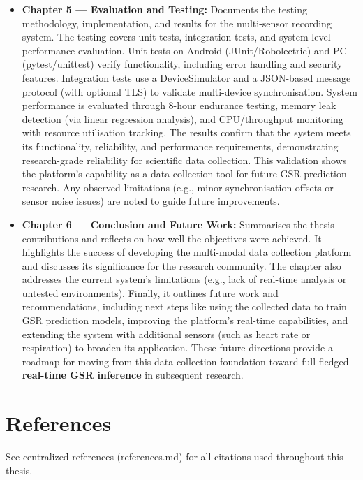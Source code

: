 \begin{itemize}
  \item \textbf{Chapter 5 --- Evaluation and Testing:} Documents the testing methodology, implementation, and results for the multi-sensor recording system. The testing covers unit tests, integration tests, and system-level performance evaluation. Unit tests on Android (JUnit/Robolectric) and PC (pytest/unittest) verify functionality, including error handling and security features. Integration tests use a DeviceSimulator and a JSON-based message protocol (with optional TLS) to validate multi-device synchronisation. System performance is evaluated through 8-hour endurance testing, memory leak detection (via linear regression analysis), and CPU/throughput monitoring with resource utilisation tracking. The results confirm that the system meets its functionality, reliability, and performance requirements, demonstrating research-grade reliability for scientific data collection. This validation shows the platform's capability as a data collection tool for future GSR prediction research. Any observed limitations (e.g., minor synchronisation offsets or sensor noise issues) are noted to guide future improvements.
  \item \textbf{Chapter 6 --- Conclusion and Future Work:} Summarises the thesis contributions and reflects on how well the objectives were achieved. It highlights the success of developing the multi-modal data collection platform and discusses its significance for the research community. The chapter also addresses the current system's limitations (e.g., lack of real-time analysis or untested environments). Finally, it outlines future work and recommendations, including next steps like using the collected data to train GSR prediction models, improving the platform's real-time capabilities, and extending the system with additional sensors (such as heart rate or respiration) to broaden its application. These future directions provide a roadmap for moving from this data collection foundation toward full-fledged \textbf{real-time GSR inference} in subsequent research.
\end{itemize}

\section*{References}
See centralized references (references.md) for all citations used throughout this thesis.
